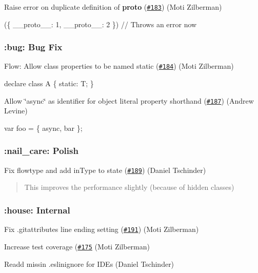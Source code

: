 Raise error on duplicate definition of {\bfseries proto} (\href{https://github.com/babel/babylon/pull/183}{\tt \#183}) (Moti Zilberman)


\begin{DoxyCode}
(\{ \_\_proto\_\_: 1, \_\_proto\_\_: 2 \}) // Throws an error now
\end{DoxyCode}


\subsubsection*{\+:bug\+: Bug Fix}

Flow\+: Allow class properties to be named {\ttfamily static} (\href{https://github.com/babel/babylon/pull/184}{\tt \#184}) (Moti Zilberman)


\begin{DoxyCode}
declare class A \{
  static: T;
\}
\end{DoxyCode}


Allow \char`\"{}async\char`\"{} as identifier for object literal property shorthand (\href{https://github.com/babel/babylon/pull/187}{\tt \#187}) (Andrew Levine)


\begin{DoxyCode}
var foo = \{ async, bar \};
\end{DoxyCode}


\subsubsection*{\+:nail\+\_\+care\+: Polish}

Fix flowtype and add in\+Type to state (\href{https://github.com/babel/babylon/pull/189}{\tt \#189}) (Daniel Tschinder)

\begin{quote}
This improves the performance slightly (because of hidden classes) \end{quote}


\subsubsection*{\+:house\+: Internal}

Fix .gitattributes line ending setting (\href{https://github.com/babel/babylon/pull/191}{\tt \#191}) (Moti Zilberman)

Increase test coverage (\href{https://github.com/babel/babylon/pull/175}{\tt \#175} (Moti Zilberman)

Readd missin .eslinignore for I\+D\+Es (Daniel Tschinder)

